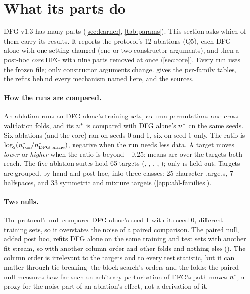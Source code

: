 \section{What its parts do}\label{sec:ablations}

DFG v1.3 has many parts (\cref{sec:learner}, \cref{tab:params}). This section asks which of them carry its results. It reports the protocol's 12 ablations (Q5), each DFG alone with one setting changed (one or two constructor arguments), and then a post-hoc \emph{core} DFG with nine parts removed at once (\cref{sec:core}). Every run uses the frozen file; only constructor arguments change.  gives the per-family tables, the refits behind every mechanism named here, and the sources.

\paragraph{How the runs are compared.} An ablation runs on DFG alone's training sets, column permutations and cross-validation folds, and its $n^{*}$ is compared with DFG alone's $n^{*}$ on the same seeds. Six ablations (and the core) ran on seeds 0 and 1, six on seed 0 only. The ratio is $\log_2(\nstar_{\rm run}/\nstar_{\rm DFG\ alone})$, negative when the run needs less data. A target moves \emph{lower} or \emph{higher} when the ratio is beyond $\mp0.25$; means are over the targets both reach. The five ablation suites hold 65 targets (, , , , ); only  is held out. Targets are grouped, by hand and post hoc, into three classes: 25 character targets, 7 halfspaces, and 33 symmetric and mixture targets (\cref{app:abl-families}).

\paragraph{Two nulls.} The protocol's null compares DFG alone's seed 1 with its seed 0, different training sets, so it overstates the noise of a paired comparison. The paired null, added post hoc, refits DFG alone on the same training and test sets with another fit stream, so with another column order and other folds and nothing else (). The column order is irrelevant to the targets and to every test statistic, but it can matter through tie-breaking, the block search's orders and the folds; the paired null measures how far such an arbitrary perturbation of DFG's path moves $n^{*}$, a proxy for the noise part of an ablation's effect, not a derivation of it.


